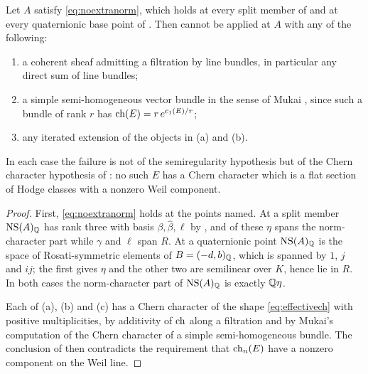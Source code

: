 \begin{corollary}\label{cor:nofiltered}
Let $A$ satisfy \eqref{eq:noextranorm}, which holds at every split member of
\cite[Theorem~15.2]{paperI} and at every quaternionic base point of
\cite[Theorem~15.25]{paperI}. Then  cannot be applied at $A$
with any of the following:
\begin{enumerate}[label=\textup{(\alph*)},nosep]
\item a coherent sheaf admitting a filtration by line bundles, in particular
  any direct sum of line bundles;
\item a simple semi-homogeneous vector bundle in the sense of Mukai
  \cite{Muk78}, since such a bundle of rank $r$ has $\operatorname{ch}(E)=r\,e^{c_{1}(E)/r}$;
\item any iterated extension of the objects in (a) and (b).
\end{enumerate}
In each case the failure is not of the semiregularity hypothesis but of the
Chern character hypothesis of : no such $E$ has a Chern
character which is a flat section of Hodge classes with a nonzero Weil
component.
\end{corollary}

\begin{proof}
First, \eqref{eq:noextranorm} holds at the points named. At a split member
$\mathrm{NS}(A)_{\mathbb{Q}}$ has rank three with basis $\beta,\widehat\beta,\ell$ by
\cite[Proposition~15.19(iv)]{paperI}, and of these $\eta$ spans the norm-character part
while $\gamma$ and $\ell$ span $R$. At a quaternionic point $\mathrm{NS}(A)_{\mathbb{Q}}$ is
the space of Rosati-symmetric elements of $B=(-d,b)_{\mathbb{Q}}$, which is spanned
by $1$, $j$ and $ij$; the first gives $\eta$ and the other two are semilinear
over $K$, hence lie in $R$. In both cases the norm-character part of
$\mathrm{NS}(A)_{\mathbb{Q}}$ is exactly $\mathbb{Q}\eta$.

Each of (a), (b) and (c) has a Chern character of the shape
\eqref{eq:effectivech} with positive multiplicities, by additivity of $\operatorname{ch}$
along a filtration and by Mukai's computation of the Chern character of a
simple semi-homogeneous bundle. The conclusion of  then
contradicts the requirement that $\operatorname{ch}_{n}(E)$ have a nonzero component on the
Weil line.
\end{proof}

